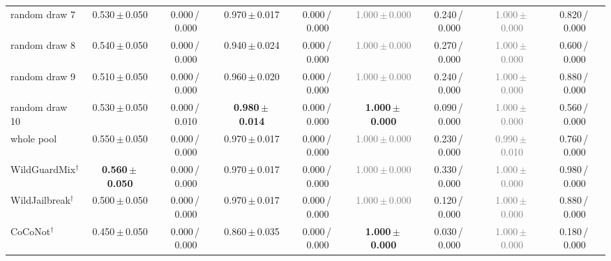 \begin{tabular}{@{}lcccccccc@{}}
random draw 7 & 0.530\,{\scriptsize$\pm$\,0.050} & {\scriptsize 0.000\,/\,0.000} & 0.970\,{\scriptsize$\pm$\,0.017} & {\scriptsize 0.000\,/\,0.000} & \textcolor{gray}{1.000\,{\scriptsize$\pm$\,0.000}} & {\scriptsize 0.240\,/\,0.000} & \textcolor{gray}{1.000\,{\scriptsize$\pm$\,0.000}} & {\scriptsize 0.820\,/\,0.000} \\
random draw 8 & 0.540\,{\scriptsize$\pm$\,0.050} & {\scriptsize 0.000\,/\,0.000} & 0.940\,{\scriptsize$\pm$\,0.024} & {\scriptsize 0.000\,/\,0.000} & \textcolor{gray}{1.000\,{\scriptsize$\pm$\,0.000}} & {\scriptsize 0.270\,/\,0.000} & \textcolor{gray}{1.000\,{\scriptsize$\pm$\,0.000}} & {\scriptsize 0.600\,/\,0.000} \\
random draw 9 & 0.510\,{\scriptsize$\pm$\,0.050} & {\scriptsize 0.000\,/\,0.000} & 0.960\,{\scriptsize$\pm$\,0.020} & {\scriptsize 0.000\,/\,0.000} & \textcolor{gray}{1.000\,{\scriptsize$\pm$\,0.000}} & {\scriptsize 0.240\,/\,0.000} & \textcolor{gray}{1.000\,{\scriptsize$\pm$\,0.000}} & {\scriptsize 0.880\,/\,0.000} \\
random draw 10 & 0.530\,{\scriptsize$\pm$\,0.050} & {\scriptsize 0.000\,/\,0.010} & \textbf{0.980\,{\scriptsize$\pm$\,0.014}} & {\scriptsize 0.000\,/\,0.000} & \textbf{1.000\,{\scriptsize$\pm$\,0.000}} & {\scriptsize 0.090\,/\,0.000} & \textcolor{gray}{1.000\,{\scriptsize$\pm$\,0.000}} & {\scriptsize 0.560\,/\,0.000} \\
whole pool & 0.550\,{\scriptsize$\pm$\,0.050} & {\scriptsize 0.000\,/\,0.000} & 0.970\,{\scriptsize$\pm$\,0.017} & {\scriptsize 0.000\,/\,0.000} & \textcolor{gray}{1.000\,{\scriptsize$\pm$\,0.000}} & {\scriptsize 0.230\,/\,0.000} & \textcolor{gray}{0.990\,{\scriptsize$\pm$\,0.010}} & {\scriptsize 0.760\,/\,0.000} \\
WildGuardMix$^\dagger$ & \textbf{0.560\,{\scriptsize$\pm$\,0.050}} & {\scriptsize 0.000\,/\,0.000} & 0.970\,{\scriptsize$\pm$\,0.017} & {\scriptsize 0.000\,/\,0.000} & \textcolor{gray}{1.000\,{\scriptsize$\pm$\,0.000}} & {\scriptsize 0.330\,/\,0.000} & \textcolor{gray}{1.000\,{\scriptsize$\pm$\,0.000}} & {\scriptsize 0.980\,/\,0.000} \\
WildJailbreak$^\dagger$ & 0.500\,{\scriptsize$\pm$\,0.050} & {\scriptsize 0.000\,/\,0.000} & 0.970\,{\scriptsize$\pm$\,0.017} & {\scriptsize 0.000\,/\,0.000} & \textcolor{gray}{1.000\,{\scriptsize$\pm$\,0.000}} & {\scriptsize 0.120\,/\,0.000} & \textcolor{gray}{1.000\,{\scriptsize$\pm$\,0.000}} & {\scriptsize 0.880\,/\,0.000} \\
CoCoNot$^\dagger$ & 0.450\,{\scriptsize$\pm$\,0.050} & {\scriptsize 0.000\,/\,0.000} & 0.860\,{\scriptsize$\pm$\,0.035} & {\scriptsize 0.000\,/\,0.000} & \textbf{1.000\,{\scriptsize$\pm$\,0.000}} & {\scriptsize 0.030\,/\,0.000} & \textcolor{gray}{1.000\,{\scriptsize$\pm$\,0.000}} & {\scriptsize 0.180\,/\,0.000} \\

\end{tabular}

